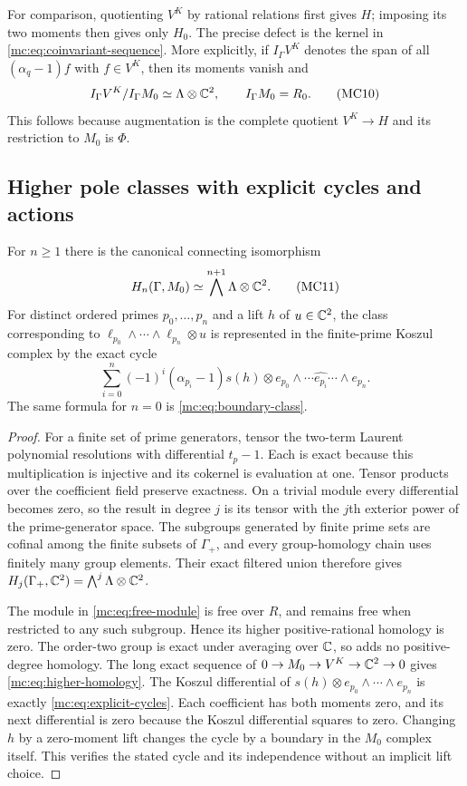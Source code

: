 For comparison, quotienting $V^K$ by rational relations first gives
$H$; imposing its two moments then gives only $H_0$. The precise
defect is the kernel in \eqref{mc:eq:coinvariant-sequence}. More
explicitly, if $I_\Gamma V^K$ denotes the span of all
$(\alpha_q-1)f$ with $f\in V^K$, then its moments vanish and
\[
 I_\Gamma V^K/I_\Gamma M_0\simeq\Lambda\otimes\mathbb C^2,
 \qquad I_\Gamma M_0=R_0.
 \tag{MC10}\label{mc:eq:order-defect}
\]
This follows because augmentation is the complete quotient
$V^K\to H$ and its restriction to $M_0$ is $\Phi$.

\subsection{Higher pole classes with explicit cycles and actions}

\begin{theorem}
\label{mc:thm:homology}
For $n\ge1$ there is the canonical connecting isomorphism
\[
 H_n(\Gamma,M_0)\simeq
       \bigwedge^{n+1}\Lambda\otimes\mathbb C^2.
 \tag{MC11}\label{mc:eq:higher-homology}
\]
For distinct ordered primes $p_0,\ldots,p_n$ and a lift $h$ of
$u\in\mathbb C^2$, the class corresponding to
$\ell_{p_0}\wedge\cdots\wedge\ell_{p_n}\otimes u$ is represented
in the finite-prime Koszul complex by the exact cycle
\[
 \sum_{i=0}^{n}(-1)^i(\alpha_{p_i}-1)s(h)
       \otimes e_{p_0}\wedge\cdots\widehat{e_{p_i}}
                                      \cdots\wedge e_{p_n}.
 \tag{MC12}\label{mc:eq:explicit-cycles}
\]
The same formula for $n=0$ is \eqref{mc:eq:boundary-class}.
\end{theorem}
\begin{proof}
For a finite set of prime generators, tensor the two-term Laurent
polynomial resolutions with differential $t_p-1$. Each is exact
because this multiplication is injective and its cokernel is
evaluation at one. Tensor products over the coefficient field
preserve exactness. On a trivial module every differential becomes
zero, so the result in degree $j$ is its tensor with the $j$th
exterior power of the prime-generator space. The subgroups generated
by finite prime sets are cofinal among the finite subsets of
$\Gamma_+$, and every group-homology chain uses finitely many group
elements. Their exact filtered union therefore gives
$H_j(\Gamma_+,\mathbb C^2)=\bigwedge^j\Lambda\otimes\mathbb C^2$.

The module in \eqref{mc:eq:free-module} is free over $R$, and remains
free when restricted to any such subgroup. Hence its higher
positive-rational homology is zero. The order-two group is exact
under averaging over $\mathbb C$, so adds no positive-degree homology.
The long exact sequence of
$0\to M_0\to V^K\to\mathbb C^2\to0$ gives
\eqref{mc:eq:higher-homology}. The Koszul differential of
$s(h)\otimes e_{p_0}\wedge\cdots\wedge e_{p_n}$ is exactly
\eqref{mc:eq:explicit-cycles}. Each coefficient has both moments zero,
and its next differential is zero because the Koszul differential
squares to zero. Changing $h$ by a zero-moment lift changes the
cycle by a boundary in the $M_0$ complex itself. This verifies the
stated cycle and its independence without an implicit lift choice.
\end{proof}


